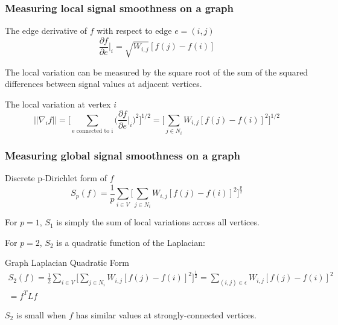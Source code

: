 \documentclass{beamer}
\begin{document}
\begin{frame}
  \frametitle{Measuring local signal smoothness on a graph}
  \begin{block}{The edge derivative of $f$ with respect to edge $e=(i,j)$}
    \begin{equation}
      \frac{\partial f}{\partial e} \bigg|_i = \sqrt{W_{i,j}} [f(j) - f(i)]
    \end{equation}
  \end{block}

  The local variation can be measured by the square root of the sum of the squared differences
  between signal values at adjacent vertices.
  
  \begin{block}{The local variation at vertex $i$}
    \begin{equation}
      || \nabla_i f || = \bigg[ \sum_{\text{e connected to i}} \bigg( \frac{\partial f}{\partial e} \bigg|_i \bigg)^2 \bigg]^{1/2} = \bigg[ \sum_{j \in N_i} W_{i,j} [f(j) - f(i)]^2 \bigg]^{1/2}
    \end{equation}
  \end{block}
\end{frame}

\begin{frame}
  \frametitle{Measuring global signal smoothness on a graph}

  \begin{block}{Discrete p-Dirichlet form of $f$}
    \begin{equation}
      S_p(f) = \frac{1}{p} \sum_{i \in V} \bigg[ \sum_{j \in N_i} W_{i,j} [f(j) - f(i)]^2 \bigg]^{\frac{p}{2}}
    \end{equation}
  \end{block}

  For $p=1$, $S_1$ is simply the sum of local variations across all vertices.

  For $p=2$, $S_2$ is a quadratic function of the Laplacian:

  \begin{block}{Graph Laplacian Quadratic Form}
    \begin{equation}
      \begin{split}
        S_2(f) = \frac{1}{2} \sum_{i \in V} \bigg[ \sum_{j \in N_i} W_{i,j}
        [f(j) - f(i)]^2 \bigg]^{\frac{1}{2}} = \sum_{(i, j) \in \epsilon}
        W_{i,j} [f(j) - f(i)]^2 \\
        = f^T L f
      \end{split}
    \end{equation}
  \end{block}

$S_2$ is small when $f$ has similar values at strongly-connected vertices.

\end{frame}
\end{document}
